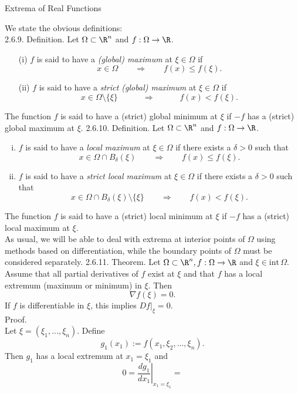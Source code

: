 \documentclass[smaller,hyperref={CJKbookmarks=true}]{beamer}
\begin{document}
\begin{frame}{Extrema of Real Functions}
\begin{spacing}{1.05}
We state the obvious definitions:\\[10pt]
\alert{2.6.9. Definition.} Let $\Omega\subset\R^n$ and $f:\Omega\to\R$.
\begin{itemize}
  \item[(i)] $f$ is said to have a \emph{(global) maximum} at $\xi\in\Omega$ if
      \[x\in\Omega\qquad\Rightarrow\qquad
      f(x)\leq f(\xi).\]
  \item[(ii)] $f$ is said to have a \emph{strict (global) maximum} at $\xi\in\Omega$ if
      \[x\in\Omega\setminus\{\xi\}\qquad\quad
      \Rightarrow\qquad\quad f(x)<f(\xi).\]
\end{itemize}
The function $f$ is said to have a (strict) global minimum at $\xi$ if $-f$ has a (strict) global maximum at $\xi$.
\newpage
\alert{2.6.10. Definition.} Let $\Omega\subset\R^n$ and $f:\Omega\to\R$.
\begin{enumerate}[(i)]
  \item $f$ is said to have a \emph{local maximum} at $\xi\in\Omega$ if there exists a $\delta>0$ such that
      \[x\in\Omega\cap B_\delta(\xi)\qquad\Rightarrow\qquad
      f(x)\leq f(\xi).\]
  \item $f$ is said to have a \emph{strict local maximum} at $\xi\in\Omega$ if there exists a $\delta>0$ such that
      \[x\in\Omega\cap B_\delta(\xi)\setminus\{\xi\}\qquad
      \Rightarrow\qquad f(x)<f(\xi).\]
\end{enumerate}
The function $f$ is said to have a (strict) local minimum at $\xi$ if $-f$ has a (strict) local maximum at $\xi$.\\[5pt]
As usual, we will be able to deal with extrema at interior points of $\Omega$ using
methods based on dif{}ferentiation, while the boundary points of $\Omega$ must be
considered separately.
\newpage
\alert{2.6.11. Theorem.} Let $\Omega\subset\R^n,f:\Omega\to\R$ and $\xi\in\text{int}\,\Omega$. Assume that all partial derivatives of $f$ exist at $\xi$ and that $f$ has a local extremum (maximum or minimum) in $\xi$. Then
\[\nabla f(\xi)=0.\]
If $f$ is dif{}ferentiable in $\xi$, this implies $Df|_\xi=0$.\\[5pt]
\alert{Proof.}\\
Let $\xi=(\xi_1,\ldots,\xi_n)$. Define
\[g_1(x_1):=f(x_1,\xi_2,\ldots,\xi_n).\]
Then $g_1$ has a local extremum at $x_1=\xi_1$ and
\[0=\left.\frac{dg_1}{dx_1}\right|_{x_1=\xi_1}=\left.
\]
\end{spacing}
\end{frame}
\end{document}
